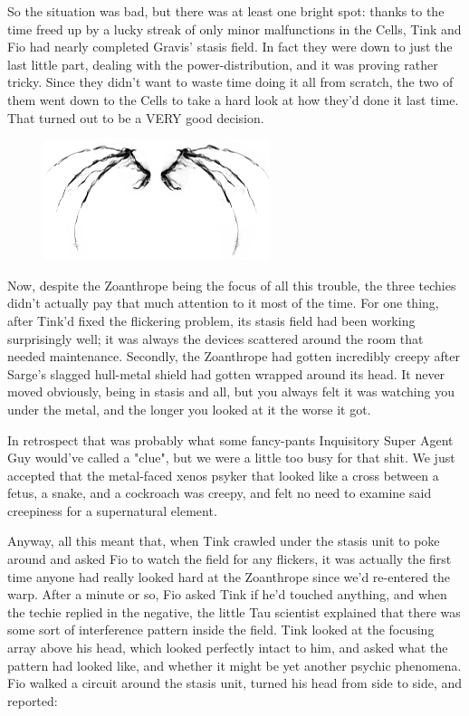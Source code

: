 So the situation was bad, but there was at least one bright spot: 
thanks to the time freed up by a lucky streak of only minor malfunctions in the Cells, Tink and Fio had nearly completed Gravis' stasis field. 
In fact they were down to just the last little part, dealing with the power-distribution, and it was proving rather tricky. 
Since they didn't want to waste time doing it all from scratch, the two of them went down to the Cells to take a hard look at how they'd done it last time. 
That turned out to be a VERY good decision.

\begin{figure}
	\begin{center}
		\includegraphics[width=\figwidth]{pics/15/37.png}
	\end{center}
\end{figure}
Now, despite the Zoanthrope being the focus of all this trouble, the three techies didn't actually pay that much attention to it most of the time. 
For one thing, after Tink'd fixed the flickering problem, its stasis field had been working surprisingly well; 
it was always the devices scattered around the room that needed maintenance. 
Secondly, the Zoanthrope had gotten incredibly creepy after Sarge's slagged hull-metal shield had gotten wrapped around its head. 
It never moved obviously, being in stasis and all, but you always felt it was watching you under the metal, and the longer you looked at it the worse it got. 


In retrospect that was probably what some fancy-pants Inquisitory Super Agent Guy would've called a "clue", but we were a little too busy for that shit. 
We just accepted that the metal-faced xenos psyker that looked like a cross between a fetus, a snake, and a cockroach was creepy, and felt no need to examine said creepiness for a supernatural element.

Anyway, all this meant that, when Tink crawled under the stasis unit to poke around and asked Fio to watch the field for any flickers, it was actually the first time anyone had really looked hard at the Zoanthrope since we'd re-entered the warp. 
After a minute or so, Fio asked Tink if he'd touched anything, and when the techie replied in the negative, the little Tau scientist explained that there was some sort of interference pattern inside the field. 
Tink looked at the focusing array above his head, which looked perfectly intact to him, and asked what the pattern had looked like, and whether it might be yet another psychic phenomena. 
Fio walked a circuit around the stasis unit, turned his head from side to side, and reported:

